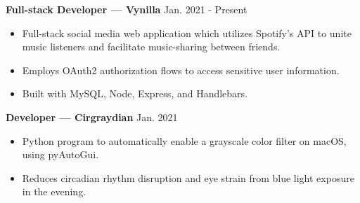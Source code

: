 \documentclass[12pt]{article}
\begin{document}
\begin{flushleft}

\hrulefill {} \quad \hrulefill

\vspace{2mm}
 
{\textbf{Full-stack Developer — Vynilla}} \hfill Jan. 2021 - Present

% 

\vspace{-3mm}

\begin{itemize} \setlength\itemsep{-0.3em}
  \item Full-stack social media web application which utilizes Spotify's API to unite music listeners and facilitate music-sharing between friends.
  \item Employs OAuth2 authorization flows to access sensitive user information.
  \item Built with MySQL, Node, Express, and Handlebars.
\end{itemize}

{\textbf{Developer — Cirgraydian}} \hfill Jan. 2021
\vspace{-2mm}
\begin{itemize} \setlength\itemsep{-0.3em}
  \item Python program to automatically enable a grayscale color filter on macOS, using pyAutoGui.
  \item Reduces circadian rhythm disruption and eye strain from blue light exposure in the evening.
\end{itemize}

\end{flushleft}
\end{document}
